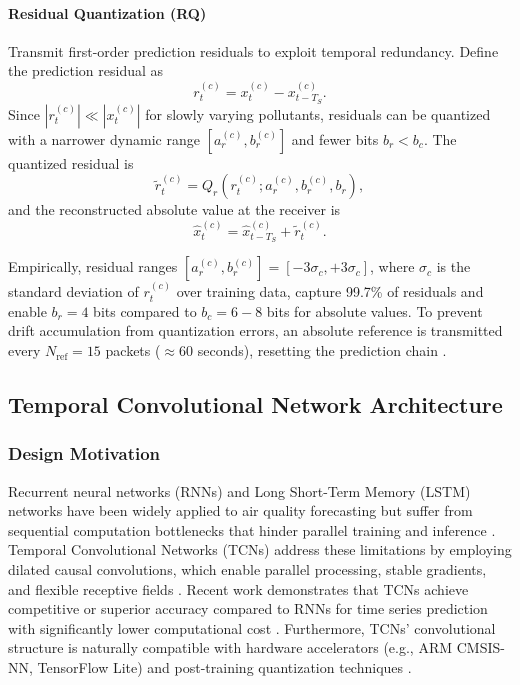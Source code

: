 \paragraph{Residual Quantization (RQ)}
Transmit first-order prediction residuals to exploit temporal redundancy. Define the prediction residual as
\begin{equation}
r_t^{(c)} = x_t^{(c)} - x_{t-T_S}^{(c)}.
\label{eq:residual}
\end{equation}
Since $|r_t^{(c)}| \ll |x_t^{(c)}|$ for slowly varying pollutants, residuals can be quantized with a narrower dynamic range $[a_r^{(c)}, b_r^{(c)}]$ and fewer bits $b_r < b_c$. The quantized residual is
\begin{equation}
\tilde{r}_t^{(c)} = Q_r(r_t^{(c)}; a_r^{(c)}, b_r^{(c)}, b_r),
\label{eq:residual_quantization}
\end{equation}
and the reconstructed absolute value at the receiver is
\begin{equation}
\hat{x}_t^{(c)} = \hat{x}_{t-T_S}^{(c)} + \tilde{r}_t^{(c)}.
\label{eq:residual_reconstruction}
\end{equation}

Empirically, residual ranges $[a_r^{(c)}, b_r^{(c)}] = [-3\sigma_c, +3\sigma_c]$, where $\sigma_c$ is the standard deviation of $r_t^{(c)}$ over training data, capture 99.7\% of residuals and enable $b_r = 4$ bits compared to $b_c = 6-8$ bits for absolute values. To prevent drift accumulation from quantization errors, an absolute reference is transmitted every $N_{\text{ref}} = 15$ packets ($\approx 60$ seconds), resetting the prediction chain \cite{przystupa2025ensuring}.

\subsection{Temporal Convolutional Network Architecture}

\subsubsection{Design Motivation}

Recurrent neural networks (RNNs) and Long Short-Term Memory (LSTM) networks have been widely applied to air quality forecasting but suffer from sequential computation bottlenecks that hinder parallel training and inference \cite{nguyen2025aiot}. Temporal Convolutional Networks (TCNs) address these limitations by employing dilated causal convolutions, which enable parallel processing, stable gradients, and flexible receptive fields \cite{bai2018tcn}. Recent work demonstrates that TCNs achieve competitive or superior accuracy compared to RNNs for time series prediction with significantly lower computational cost \cite{gunasekar2025power}. Furthermore, TCNs' convolutional structure is naturally compatible with hardware accelerators (e.g., ARM CMSIS-NN, TensorFlow Lite) and post-training quantization techniques \cite{mazinani2025air}.

